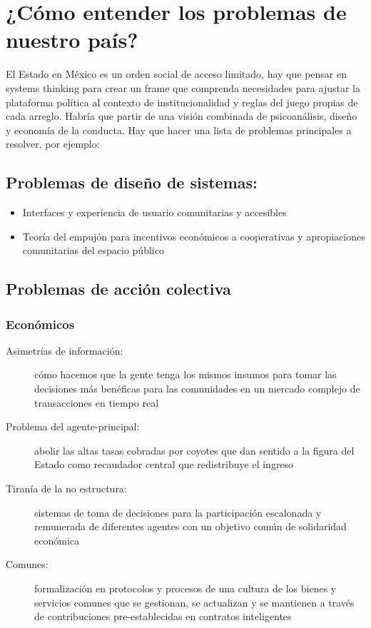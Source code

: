 \section{¿Cómo entender los problemas de nuestro país?}
\label{sec:problemaspais}

El Estado en México es un orden social de acceso limitado, hay que
pensar en systems thinking para crear un frame que comprenda necesidades
para ajustar la plataforma política al contexto de institucionalidad y
reglas del juego propias de cada arreglo. Habría que partir de una
visión combinada de psicoanálisis, diseño y economía de la conducta. Hay
que hacer una lista de problemas principales a resolver, por ejemplo:

\subsection{Problemas de diseño de sistemas:}
\label{sec:probsis}

\begin{itemize}
	\item Interfaces y experiencia de usuario comunitarias y accesibles

	\item Teoría del empujón para incentivos económicos a cooperativas y apropiaciones comunitarias del espacio público
\end{itemize}

\subsection{Problemas de acción colectiva}
\label{sub:probaccion}

\subsubsection{Económicos}
\label{subs:economicos}

\begin{description}
	\item[Asimetrías de información:] cómo hacemos que la gente tenga los mismos insumos para tomar las decisiones más benéficas para las comunidades en un mercado complejo de transacciones en tiempo real

	\item[Problema del agente-principal:] abolir las altas tasas cobradas por coyotes que dan sentido a la figura del Estado como recaudador central que redistribuye el ingreso

	\item[Tiranía de la no estructura:] sistemas de toma de decisiones para la participación escalonada y remunerada de diferentes agentes con un objetivo común de solidaridad económica

	\item[Comunes:] formalización en protocolos y procesos de una cultura de los bienes y servicios comunes que se gestionan, se actualizan y se mantienen a través de contribuciones pre-establecidas en contratos inteligentes
\end{description}

